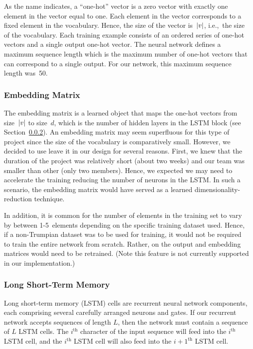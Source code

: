 \documentclass{article}
\DeclarePairedDelimiter\abs{\lvert}{\rvert}%
\begin{document}
As the name indicates, a ``one-hot'' vector is a zero vector with exactly one element in the vector equal to one.  Each element in the vector corresponds to a fixed element in the vocabulary.  Hence, the size of the vector is~$\abs*{v}$, i.e.,~the size of the vocabulary. Each training example consists of an ordered series of one-hot vectors and a single output one-hot vector.  The neural network defines a maximum sequence length which is the maximum number of one-hot vectors that can correspond to a single output.  For our network, this maximum sequence length was~50.

\subsubsection{Embedding Matrix}

The embedding matrix is a learned object that maps the one-hot vectors from size~$\abs*{v}$ to size~$d$, which is the number of hidden layers in the LSTM block (see Section~\ref{sec:lstm}).  An embedding matrix may seem superfluous for this type of project since the size of the vocabulary is comparatively small.  However, we decided to use leave it in our design for several reasons.  First, we knew that the duration of the project was relatively short (about two weeks) and our team was smaller than other (only two members).  Hence, we expected we may need to accelerate the training reducing the number of neurons in the LSTM.  In such a scenario, the embedding matrix would have served as a learned dimensionality-reduction technique.  

In addition, it is common for the number of elements in the training set to vary by between 1-5~elements depending on the specific training dataset used.  Hence, if a non-Trumpian dataset was to be used for training, it would not be required to train the entire network from scratch.  Rather, on the output and embedding matrices would need to be retrained. (Note this feature is not currently supported in our implementation.)


\subsubsection{Long Short-Term Memory}\label{sec:lstm}

Long short-term memory (LSTM) cells are recurrent neural network components, each comprising several carefully arranged neurons and gates. If our recurrent network accepts sequences of length $L$, then the network must contain a sequence of $L$ LSTM cells. The $i^{\text{th}}$ character of the input sequence will feed into the $i^{\text{th}}$ LSTM cell, and the $i^{\text{th}}$ LSTM cell will also feed into the $i+1^{\text{th}}$ LSTM cell.
\end{document}
